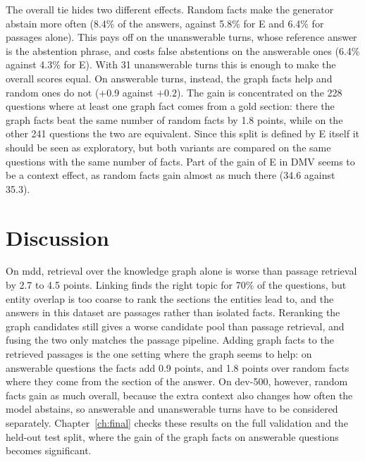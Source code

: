 The overall tie hides two different effects. Random facts make the generator abstain
more often (8.4\% of the answers, against 5.8\% for E and 6.4\% for passages alone). This
pays off on the unanswerable turns, whose reference answer is the abstention phrase, and
costs false abstentions on the answerable ones (6.4\% against 4.3\% for E). With 31
unanswerable turns this is enough to make the overall scores equal. On answerable turns,
instead, the graph facts help and random ones do not ($+0.9$ against $+0.2$). The gain is
concentrated on the 228 questions where at least one graph fact comes from a gold
section: there the graph facts beat the same number of random facts by 1.8 points, while
on the other 241 questions the two are equivalent. Since this split is defined by E
itself it should be seen as exploratory, but both variants are compared on the same
questions with the same number of facts. Part of the gain of E in DMV seems to be a
context effect, as random facts gain almost as much there (34.6 against 35.3).


\section{Discussion}\label{sec:kgret:status}

On \gls{mdd}, retrieval over the knowledge graph alone is worse than passage retrieval
by 2.7 to 4.5 \fone{} points. Linking finds the right topic for 70\% of the questions,
but entity overlap is too coarse to rank the sections the entities lead to, and the
answers in this dataset are passages rather than isolated facts. Reranking the graph
candidates still gives a worse candidate pool than passage retrieval, and fusing the two
only matches the passage pipeline. Adding graph facts to the retrieved passages is the
one setting where the graph seems to help: on answerable questions the facts add
0.9 points, and 1.8 points over random facts where they come from the section of the
answer. On dev-500, however, random facts gain as much overall, because the extra context
also changes how often the model abstains, so answerable and unanswerable turns have to
be considered separately. Chapter~\ref{ch:final} checks these results on the full
validation and the held-out test split, where the gain of the graph facts on answerable
questions becomes significant.
